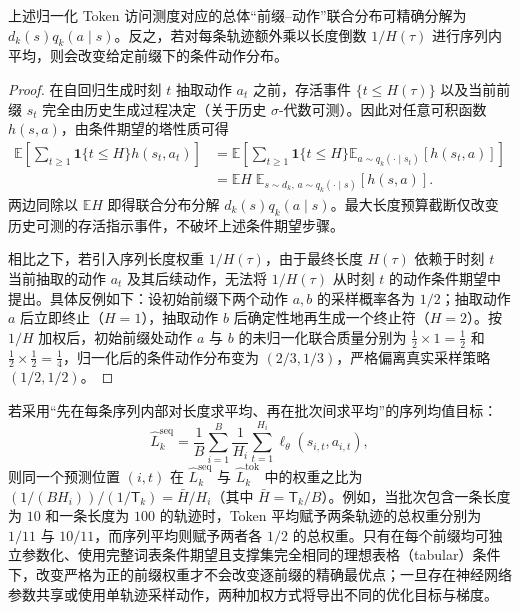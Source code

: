 \documentclass[lang=cn,scheme=chinese,openany]{elegantbook}
\begin{document}
\begin{proposition}[访问测度与条件动作分布的分解]
\label{prop:prefix-measure-decomp}
上述归一化 Token 访问测度对应的总体“前缀--动作”联合分布可精确分解为 $d_k(s) q_k(a\mid s)$。反之，若对每条轨迹额外乘以长度倒数 $1/H(\tau)$ 进行序列内平均，则会改变给定前缀下的条件动作分布。
\end{proposition}
\begin{proof}
在自回归生成时刻 $t$ 抽取动作 $a_t$ 之前，存活事件 $\{t\le H(\tau)\}$ 以及当前前缀 $s_t$ 完全由历史生成过程决定（关于历史 $\sigma$-代数可测）。因此对任意可积函数 $h(s,a)$，由条件期望的塔性质可得
\begin{align}
 \mathbb E\left[\sum_{t\ge1}\mathbf1\{t\le H\}h(s_t,a_t)\right]
 &=\mathbb E\left[\sum_{t\ge1}\mathbf1\{t\le H\}
 \mathbb E_{a\sim q_k(\cdot\mid s_t)}[h(s_t,a)]\right]\\
 &=\mathbb E H\;\mathbb E_{s\sim d_k,\,a\sim q_k(\cdot\mid s)}[h(s,a)].
\end{align}
两边同除以 $\mathbb E H$ 即得联合分布分解 $d_k(s)q_k(a\mid s)$。最大长度预算截断仅改变历史可测的存活指示事件，不破坏上述条件期望步骤。

相比之下，若引入序列长度权重 $1/H(\tau)$，由于最终长度 $H(\tau)$ 依赖于时刻 $t$ 当前抽取的动作 $a_t$ 及其后续动作，无法将 $1/H(\tau)$ 从时刻 $t$ 的动作条件期望中提出。具体反例如下：设初始前缀下两个动作 $a,b$ 的采样概率各为 $1/2$；抽取动作 $a$ 后立即终止（$H=1$），抽取动作 $b$ 后确定性地再生成一个终止符（$H=2$）。按 $1/H$ 加权后，初始前缀处动作 $a$ 与 $b$ 的未归一化联合质量分别为 $\frac12\times 1 = \frac12$ 和 $\frac12\times \frac12 = \frac14$，归一化后的条件动作分布变为 $(2/3, 1/3)$，严格偏离真实采样策略 $(1/2, 1/2)$。
\end{proof}

若采用“先在每条序列内部对长度求平均、再在批次间求平均”的序列均值目标：
\begin{equation}
 \widehat L_k^{\mathrm{seq}}=
 \frac1B\sum_{i=1}^B\frac1{H_i}\sum_{t=1}^{H_i}\ell_\theta(s_{i,t},a_{i,t}),
\end{equation}
则同一个预测位置 $(i,t)$ 在 $\widehat L_k^{\mathrm{seq}}$ 与 $\widehat L_k^{\mathrm{tok}}$ 中的权重之比为 $(1/(BH_i))/(1/\mathsf T_k)=\bar H/H_i$（其中 $\bar H=\mathsf T_k/B$）。例如，当批次包含一条长度为 $10$ 和一条长度为 $100$ 的轨迹时，Token 平均赋予两条轨迹的总权重分别为 $1/11$ 与 $10/11$，而序列平均则赋予两者各 $1/2$ 的总权重。只有在每个前缀均可独立参数化、使用完整词表条件期望且支撑集完全相同的理想表格（tabular）条件下，改变严格为正的前缀权重才不会改变逐前缀的精确最优点；一旦存在神经网络参数共享或使用单轨迹采样动作，两种加权方式将导出不同的优化目标与梯度。
\end{document}

